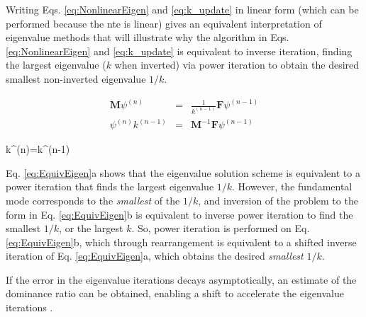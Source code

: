 Writing Eqs. \eqref{eq:NonlinearEigen} and \eqref{eq:k_update} in linear form (which can be performed because the \gls{nte} is linear) gives an equivalent interpretation of eigenvalue methods that will illustrate why the algorithm in Eqs. \eqref{eq:NonlinearEigen} and \eqref{eq:k_update} is equivalent to inverse iteration, finding the largest eigenvalue (\(k\) when inverted) via power iteration to obtain the desired smallest non-inverted eigenvalue \(1/k\).

\begin{subequations}
\label{eq:EquivEigen}
\begin{eqnarray}
\textbf{M}\psi^{(n)}&=&\frac{1}{k^{(n-1)}}\textbf{F}\psi^{(n-1)}\\
\psi^{(n)}k^{(n-1)}&=&\textbf{M}^{-1}\textbf{F}\psi^{(n-1)}
\end{eqnarray}
\end{subequations}

\beq
k^{(n)}=k^{(n-1)}
\eeq

Eq. \eqref{eq:EquivEigen}a shows that the eigenvalue solution scheme is equivalent to a power iteration that finds the largest eigenvalue \(1/k\). However, the fundamental mode corresponds to the {\it smallest} of the \(1/k\), and inversion of the problem to the form in Eq. \eqref{eq:EquivEigen}b is equivalent to inverse power iteration to find the smallest \(1/k\), or the largest \(k\). So, power iteration is performed on Eq. \eqref{eq:EquivEigen}b, which through rearrangement is equivalent to a shifted inverse iteration of Eq. \eqref{eq:EquivEigen}a, which obtains the desired {\it smallest} \(1/k\).

If the error in the eigenvalue iterations decays asymptotically, an estimate of the dominance ratio can be obtained, enabling a shift to accelerate the eigenvalue iterations \cite{tyobeka}.
